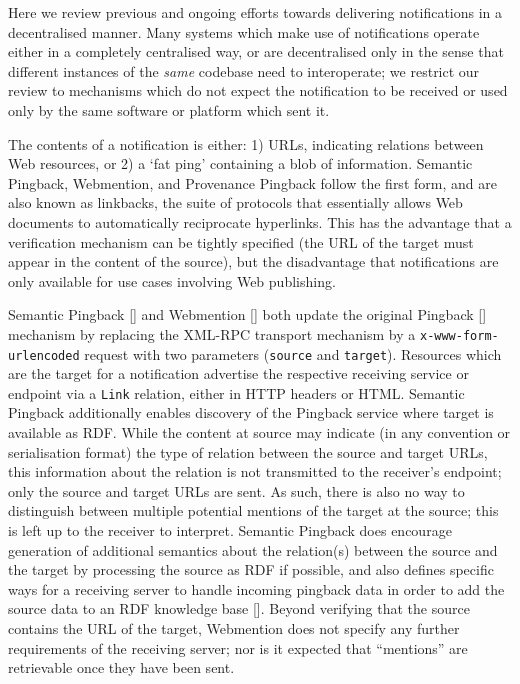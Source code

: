 \documentclass[a4paper]{llncs}
\begin{document}
                        
                            
\par Here we review previous and ongoing efforts towards delivering notifications in a decentralised manner. Many systems which make use of notifications operate either in a completely centralised way, or are decentralised only in the sense that different instances of the {\em same} codebase need to interoperate; we restrict our review to mechanisms which do not expect the notification to be received or used only by the same software or platform which sent it.

                            
\par The contents of a notification is either: 1) URLs, indicating relations between Web resources, or 2) a ‘fat ping’ containing a blob of information. Semantic Pingback, Webmention, and Provenance Pingback follow the first form, and are also known as linkbacks, the suite of protocols that essentially allows Web documents to automatically reciprocate hyperlinks. This has the advantage that a verification mechanism can be tightly specified (the URL of the target must appear in the content of the source), but the disadvantage that notifications are only available for use cases involving Web publishing.

                            
\par \empty Semantic Pingback [] and \empty Webmention [] both update the original \empty Pingback [] mechanism by replacing the XML-RPC transport mechanism by a {\tt x-www-form-urlencoded} request with two parameters ({\tt source} and {\tt target}). Resources which are the target for a notification advertise the respective receiving service or endpoint via a {\tt Link} relation, either in HTTP headers or HTML. Semantic Pingback additionally enables discovery of the Pingback service where target is available as RDF. While the content at source may indicate (in any convention or serialisation format) the type of relation between the source and target URLs, this information about the relation is not transmitted to the receiver’s endpoint; only the source and target URLs are sent. As such, there is also no way to distinguish between multiple potential mentions of the target at the source; this is left up to the receiver to interpret. Semantic Pingback does encourage generation of additional semantics about the relation(s) between the source and the target by processing the source as RDF if possible, and also defines specific ways for a receiving server to handle incoming pingback data in order to add the source data to an RDF knowledge base []. Beyond verifying that the source contains the URL of the target, Webmention does not specify any further requirements of the receiving server; nor is it expected that “mentions” are retrievable once they have been sent. 
\end{document}
